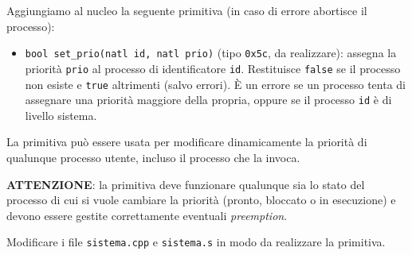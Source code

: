 Aggiungiamo al nucleo la seguente primitiva (in caso di errore abortisce il processo):
\begin{itemize}
	\item \verb|bool set_prio(natl id, natl prio)| (tipo \verb|0x5c|, da realizzare):
	assegna la priorit\`a \verb|prio| al processo di identificatore \verb|id|. 
	Restituisce \verb|false| se il processo non esiste e \verb|true| altrimenti
	(salvo errori). \`E un
	errore se un processo tenta di assegnare una priorit\`a maggiore della propria, oppure
	se il processo \verb|id| \`e di livello sistema.
\end{itemize}

La primitiva pu\`o essere usata per modificare dinamicamente la priorit\`a di qualunque processo
utente, incluso il processo che la invoca.

{\bf ATTENZIONE}: la primitiva deve funzionare qualunque sia lo stato del processo di cui si vuole
cambiare la priorit\`a (pronto, bloccato o in esecuzione) e devono essere gestite correttamente
eventuali {\em preemption}.

Modificare i file \verb|sistema.cpp| e \verb|sistema.s| in modo da realizzare la primitiva.
